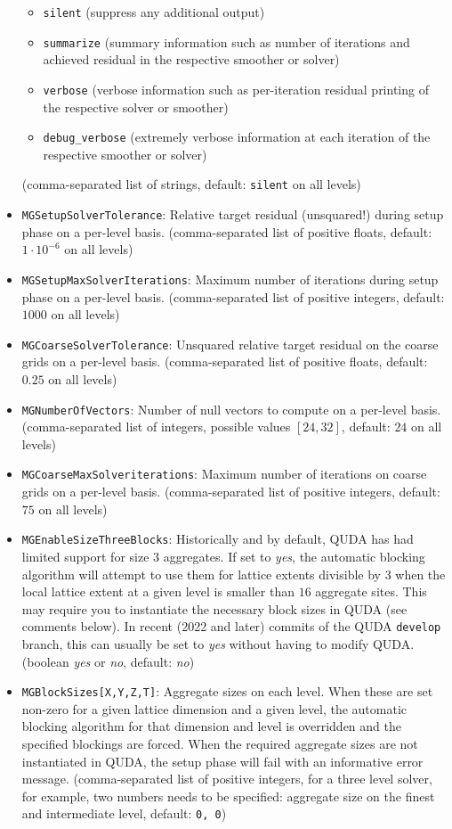 \begin{itemize}
{    \begin{itemize}
      \item \texttt{silent} (suppress any additional output)
      \item \texttt{summarize} (summary information such as number of iterations and achieved residual in the respective smoother or solver)
      \item \texttt{verbose} (verbose information such as per-iteration residual printing of the respective solver or smoother)
      \item \texttt{debug\_verbose} (extremely verbose information at each iteration of the respective smoother or solver)
    \end{itemize}
    (comma-separated list of strings, default: \texttt{silent} on all levels)}
  \item{ \texttt{MGSetupSolverTolerance}: Relative target residual (unsquared!) during setup phase on a per-level basis. (comma-separated list of positive floats, default: $1\cdot10^{-6}$ on all levels) }
  \item{ \texttt{MGSetupMaxSolverIterations}: Maximum number of iterations during setup phase on a per-level basis. (comma-separated list of positive integers, default: $1000$ on all levels) }
  \item{ \texttt{MGCoarseSolverTolerance}: Unsquared relative target residual on the coarse grids on a per-level basis. (comma-separated list of positive floats, default: $0.25$ on all levels) }
  \item{ \texttt{MGNumberOfVectors}: Number of null vectors to compute on a per-level basis. (comma-separated list of integers, possible values $\left[ 24, 32 \right]$, default: $24$ on all levels)}
  \item{ \texttt{MGCoarseMaxSolveriterations}: Maximum number of iterations on coarse grids on a per-level basis. (comma-separated list of positive integers, default: $75$ on all levels) }
  \item{ \texttt{MGEnableSizeThreeBlocks}: Historically and by default, QUDA has had limited support for size $3$ aggregates. If set to \emph{yes}, the automatic blocking algorithm will attempt to use them for lattice extents divisible by $3$ when the local lattice extent at a given level is smaller than $16$ aggregate sites. This may require you to instantiate the necessary block sizes in QUDA (see comments below). In recent (2022 and later) commits of the QUDA \texttt{develop} branch, this can usually be set to \emph{yes} without having to modify QUDA. (boolean \emph{yes} or \emph{no}, default: \emph{no}) }
  \item{ \texttt{MGBlockSizes[X,Y,Z,T]}: Aggregate sizes on each level. When these are set non-zero for a given lattice dimension and a given level, the automatic blocking algorithm for that dimension and level is overridden and the specified blockings are forced. When the required aggregate sizes are not instantiated in QUDA, the setup phase will fail with an informative error message. (comma-separated list of positive integers, for a three level solver, for example, two numbers needs to be specified: aggregate size on the finest and intermediate level, default: \texttt{0, 0})}
\end{itemize}

